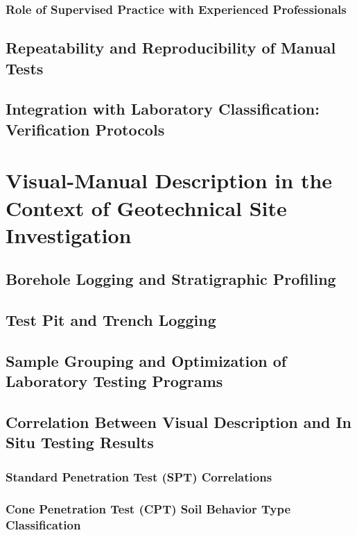 \subsubsection{Role of Supervised Practice with Experienced Professionals}

\subsection{Repeatability and Reproducibility of Manual Tests}

\subsection{Integration with Laboratory Classification: Verification Protocols}

\section{Visual-Manual Description in the Context of Geotechnical Site Investigation}

\subsection{Borehole Logging and Stratigraphic Profiling}

\subsection{Test Pit and Trench Logging}

\subsection{Sample Grouping and Optimization of Laboratory Testing Programs}

\subsection{Correlation Between Visual Description and In Situ Testing Results}

\subsubsection{Standard Penetration Test (SPT) Correlations}

\subsubsection{Cone Penetration Test (CPT) Soil Behavior Type Classification}

